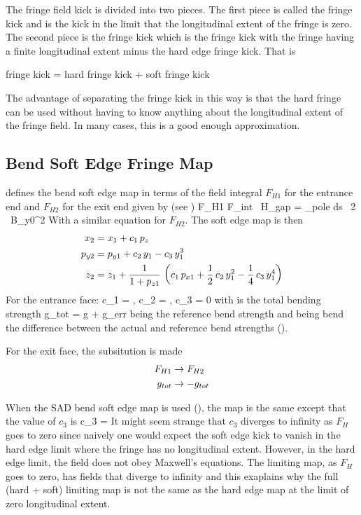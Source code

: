 The fringe field kick is divided into two pieces. 
The first piece is called the  fringe kick and is the kick in the limit
that the longitudinal extent of the fringe is zero. The second piece is the 
 fringe kick which is the fringe kick with the fringe having a finite
longitudinal extent minus the hard edge fringe kick. That is
\begin{example}
  fringe kick = hard fringe kick + soft fringe kick
\end{example}
The advantage of separating the fringe kick in this way is that the hard fringe can
be used without having to know anything about the longitudinal extent of the fringe
field. In many cases, this is a good enough approximation. 

\subsection{Bend Soft Edge Fringe Map}


\bmad defines the bend soft edge map in terms of the field integral
$F_{H1}$ for the entrance end and $F_{H2}$ for the exit end given by
(see )
\Begineq
  F_{H1} \equiv F_{int} \, H_{gap} = \int_{pole} \! \! ds \, 
  {2 \, B_{y0}^2}
\Endeq
With a similar equation for $F_{H2}$.
The soft edge map is then
\begin{align}
  x_2 &=  x_1 + c_1 \, p_z \nonumber \\
  p_{y2} &= p_{y1} + c_2 \, y_1 - c_3 \, y_1^3 \\
  z_2 &= z_1 + \frac{1}{1 + p_{z1}} \, \left( 
    c_1 \, p_{x1} + \frac{1}{2} \, c_2 \, y_1^2 -\frac{1}{4} \, c_3 \, y_1^4 \right)
    \nonumber
\end{align}
For the entrance face:
\Begineq
  c_1 = , \qquad 
  c_2 = , \qquad 
  c_3 = 0
\Endeq
with  is the total bending strength
\Begineq
  g_{tot} = \mbox{g} + \mbox{g_err}
\Endeq
{} being the reference bend strength and  being
bend the difference between the actual and reference bend strengths
().

For the exit face, the subsitution is made
\begin{align}
  F_{H1} &\rightarrow F_{H2} \nonumber \\
  g_{tot} &\rightarrow -g_{tot}
\end{align}

When the SAD bend soft edge map is used (), the map is
the same except that the value of $c_3$ is
\Begineq
  c_3 = 
\Endeq
It might seem strange that $c_3$ diverges to infinity as $F_H$ goes to
zero since naively one would expect the soft edge kick to vanish in
the hard edge limit where the fringe has no longitudinal
extent. However, in the hard edge limit, the field does not obey
Maxwell's equations. The limiting map, as $F_H$ goes to zero, has
fields that diverge to infinity and this exaplains why the full (hard
+ soft) limiting map is not the same as the hard edge map at the limit
of zero longitudinal extent.

